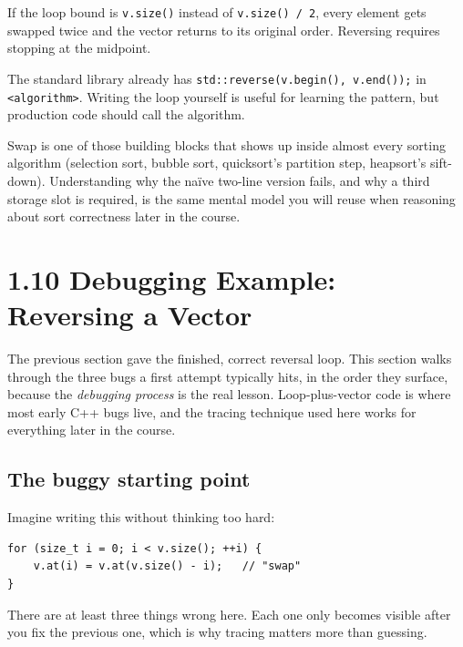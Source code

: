 \documentclass[11pt]{article}
\begin{document}
\begin{warnbox}
If the loop bound is \texttt{v.size()} instead of \texttt{v.size() / 2},
every element gets swapped twice and the vector returns to its original
order. Reversing requires stopping at the midpoint.
\end{warnbox}

\begin{notebox}
The standard library already has \texttt{std::reverse(v.begin(), v.end());}
in \texttt{<algorithm>}. Writing the loop yourself is useful for learning
the pattern, but production code should call the algorithm.
\end{notebox}

\begin{ideabox}
Swap is one of those building blocks that shows up inside almost every
sorting algorithm (selection sort, bubble sort, quicksort's partition
step, heapsort's sift-down). Understanding why the na\"ive two-line
version fails, and why a third storage slot is required, is the same
mental model you will reuse when reasoning about sort correctness later
in the course.
\end{ideabox}

\section{1.10 Debugging Example: Reversing a Vector}

The previous section gave the finished, correct reversal loop. This
section walks through the three bugs a first attempt typically hits, in
the order they surface, because the \emph{debugging process} is the real
lesson. Loop-plus-vector code is where most early C++ bugs live, and the
tracing technique used here works for everything later in the course.

\subsection{The buggy starting point}

Imagine writing this without thinking too hard:

\begin{examplebox}
\begin{verbatim}
for (size_t i = 0; i < v.size(); ++i) {
    v.at(i) = v.at(v.size() - i);   // "swap"
}
\end{verbatim}
There are at least three things wrong here. Each one only becomes visible
after you fix the previous one, which is why tracing matters more than
guessing.
\end{examplebox}
\end{document}
